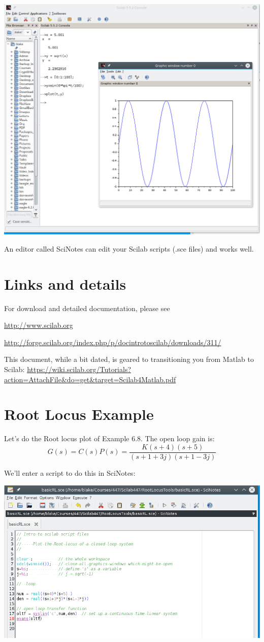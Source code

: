 \includegraphics[width=5.5in]{figs08/sshot01.png}

An editor called SciNotes can edit your Scilab scripts (.sce files) and works well. 

\section{Links and details}
For download and detailed documentation, please see

\url{http://www.scilab.org}

\url{http://forge.scilab.org/index.php/p/docintrotoscilab/downloads/311/}

This document, while a bit dated, is geared to transitioning you from Matlab to Scilab: \url{https://wiki.scilab.org/Tutorials?action=AttachFile&do=get&target=Scilab4Matlab.pdf}

 
\section{Root Locus Example}

Let's do the Root locus plot of Example 6.8.  The open loop gain is:
\[
G(s) = C(s)P(s) = \frac {K(s+4)(s+5)} {(s+1+3j)(s+1-3j)}
\]

We'll enter a script to do this in SciNotes:

\includegraphics[width=5.5in]{figs08/sshot02.png}

